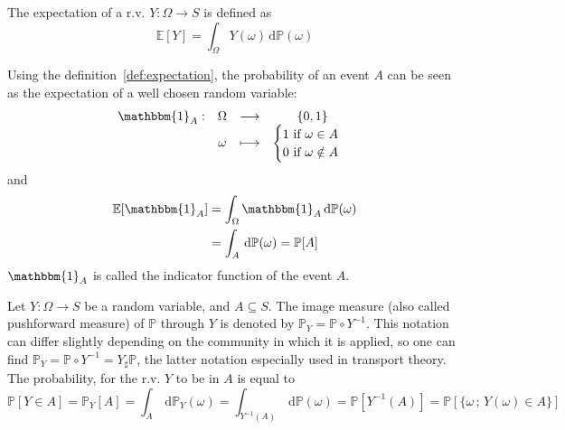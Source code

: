 \documentclass[a4paper,11pt]{article}
\newcommand{\Ex}{\mathbb{E}}
\newcommand{\Prob}{\mathbb{P}}
\theoremstyle{defi}
\numberwithin{thmCounter}{section}
\begin{document}
\begin{definition}[Expectation of a r.v.]
  \label{def:expectation}
  The expectation of a r.v. $Y:\Omega \rightarrow S$ is defined as
  \begin{equation*}
    \Ex[Y] = \int_{\Omega} Y(\omega) \,\mathrm{d}\Prob(\omega)
  \end{equation*}
\end{definition}
\begin{remark}
  Using the definition~\ref{def:expectation}, the probability of an event $A$ can be seen as the expectation of a well chosen random variable:
  \begin{equation*}
    \begin{array}{cccc}
      \mathbbm{1}_{A}:& \Omega& \longrightarrow& \{0,1\} \\
                      & \omega& \longmapsto & \begin{cases}
                        1\text{ if } \omega \in A \\
                        0 \text{ if } \omega \notin A
                                              \end{cases}
    \end{array}
  \end{equation*}
  and
  \begin{align*}
    \Ex[\mathbbm{1}_A] &= \int_{\Omega} \mathbbm{1}_A \, \mathrm{d}\Prob(\omega) \\
                       &= \int_{A} \, \mathrm{d}\Prob(\omega) = \Prob[A]
  \end{align*}
  $\mathbbm{1}_A$ is called the indicator function of the event $A$.
\end{remark}
\begin{definition}
  \label{def:image_measure}
  Let $Y:\Omega \rightarrow S$ be a random variable, and $A \subseteq S$. The image measure (also called pushforward measure) of $\Prob$ through $Y$ is denoted by $\Prob_Y = \Prob \circ Y^{-1}$. This notation can differ slightly depending on the community in which it is applied, so one can find $ \Prob_Y = \Prob \circ Y^{-1} = Y_{\sharp}\Prob$, the latter notation especially used in transport theory. The probability, for the r.v. $Y$ to be in $A$ is equal to
  \begin{equation}
    \Prob[Y \in A] = \Prob_Y[A] = \int_{A}\,\mathrm{d}\Prob_Y(\omega) =  \int_{Y^{-1}(A)}\,\mathrm{d}\Prob(\omega) = \Prob[Y^{-1}(A)] = \Prob[\{\omega\,;\,Y(\omega) \in A\}]
  \end{equation}
\end{definition}
\end{document}
